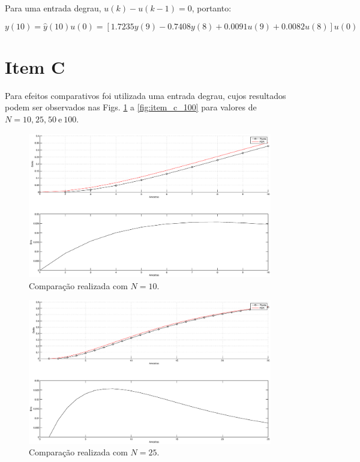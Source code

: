 Para uma entrada degrau, $u(k) - u(k-1) = 0$, portanto:

\begin{equation}
y(10) = \hat{y}(10)u(0) = 
        [1.7235y(9) - 0.7408y(8) + 0.0091u(9) + 0.0082u(8)]u(0)
\end{equation}

\section*{Item C}
Para efeitos comparativos foi utilizada uma entrada degrau, cujos resultados
podem ser observados nas Figs. \ref{fig:item_c_10} a \ref{fig:item_c_100} para
valores de $N = 10\text{,}\ 25\text{,}\ 50\ \text{e}\ 100$.

\begin{figure}[H]
\centering
    \includegraphics[width=0.95\textwidth]{imgs/questao1/item_c_N_10}
    \caption{Comparação realizada com $N = 10$.}
    \label{fig:item_c_10}
\end{figure}
    
\begin{figure}[htb]
\centering
    \includegraphics[width=0.95\textwidth]{imgs/questao1/item_c_N_25}
    \caption{Comparação realizada com $N = 25$.}
    \label{fig:item_c_25}
\end{figure}

